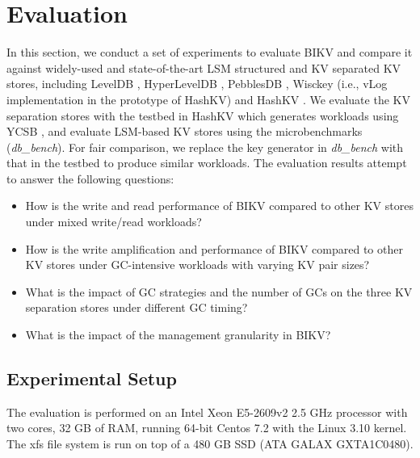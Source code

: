 \documentclass[sigconf]{acmart}
\begin{document}
\section{Evaluation} \label{evaluation}
In this section, we conduct a set of experiments to evaluate BIKV and compare it against widely-used and state-of-the-art LSM structured and KV separated KV stores, including LevelDB \cite{LevelDB}, HyperLevelDB \cite{HyperLevelDB}, PebblesDB \cite{PebblesDB}, Wisckey \cite{Wisckey} (i.e., vLog implementation in the prototype of HashKV) and HashKV \cite{HashKV}. We evaluate the KV separation stores with the testbed in HashKV which generates workloads using YCSB \cite{YCSB}, and evaluate LSM-based KV stores using the microbenchmarks (\textit{db\_bench}). For fair comparison, we replace the key generator in \textit{db\_bench} with that in the testbed to produce similar workloads. The evaluation results attempt to answer the following questions:
\begin{itemize}
	\item How is the write and read performance of BIKV compared to other KV stores under mixed write/read workloads?
	\item How is the write amplification and performance of BIKV compared to other KV stores under GC-intensive workloads with varying KV pair sizes?
	\item What is the impact of GC strategies and the number of GCs on the three  KV separation stores under different GC timing?  
	\item What is the impact of the management granularity in BIKV?
\end{itemize}

\subsection{Experimental Setup}
The evaluation is performed on an Intel Xeon E5-2609v2 2.5 GHz processor with two cores, 32 GB of RAM, running 64-bit Centos 7.2 with the Linux 3.10 kernel. The xfs file system is run on top of a 480 GB SSD (ATA GALAX GXTA1C0480). 
\end{document}
